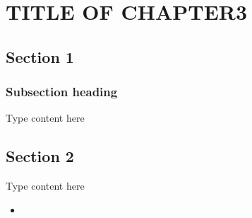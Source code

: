 \chapter{TITLE OF CHAPTER3}
\graphicspath{{Chapter3/chap3fig/}}

\section{Section 1}
\subsection{Subsection heading}
Type content here
\section{Section 2}
Type content here
\begin{itemize}
	\item 
\end{itemize}

